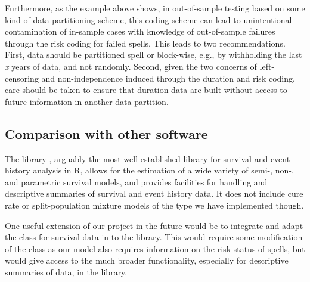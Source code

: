 Furthermore, as the example above shows, in out-of-sample testing based
on some kind of data partitioning scheme, this coding scheme can lead to
unintentional contamination of in-sample cases with knowledge of
out-of-sample failures through the risk coding for failed spells. This
leads to two recommendations. First, data should be partitioned spell or
block-wise, e.g., by withholding the last \emph{x} years of data, and
not randomly. Second, given the two concerns of left-censoring and
non-independence induced through the duration and risk coding, care
should be taken to ensure that duration data are built without access to
future information in another data partition.

\subsection{Comparison with other software}

The  library \citep{thernau2000modeling, thernau2015survival}, arguably the most well-established library for survival and event history analysis in {\sf R}, allows for the estimation of a wide variety of semi-, non-, and parametric survival models, and provides facilities for handling and descriptive summaries of survival and event history data. It does not include cure rate or split-population mixture models of the type we have implemented though.

One useful extension of our project in the future would be to integrate and adapt the  class for survival data in  to the  library. This would require some modification of the class as our model also requires information on the risk status of spells, but would give access to the much broader functionality, especially for descriptive summaries of data, in the  library. 

